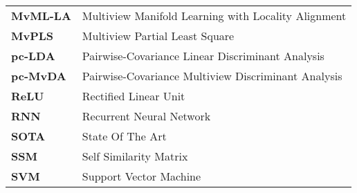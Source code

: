 \begin{longtable}{p{} p{}}
    \textbf{MvML-LA} & Multiview Manifold Learning with Locality Alignment\\
    \textbf{MvPLS} & Multiview Partial Least Square\\
    \textbf{pc-LDA} & Pairwise-Covariance Linear Discriminant Analysis\\
    \textbf{pc-MvDA} & Pairwise-Covariance Multiview Discriminant Analysis\\
    \textbf{ReLU} & Rectified Linear Unit\\
    \textbf{RNN} & Recurrent Neural Network\\
    \textbf{SOTA} & State Of The Art\\
    \textbf{SSM} & Self Similarity Matrix\\
    \textbf{SVM} & Support Vector Machine\\
\end{longtable}

\resethead
